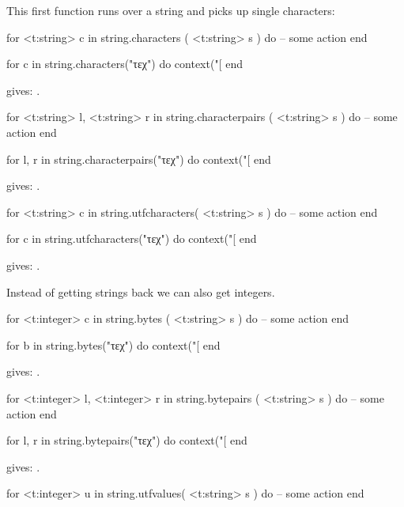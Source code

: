 This first function runs over a string and picks up single characters:

\starttyping[option=LUA]
for <t:string> c in string.characters ( <t:string> s ) do
    -- some action
end
\stoptyping

\startbuffer
\startluacode
for c in string.characters("τεχ") do
    context("[%
end
\stopluacode
\stopbuffer

\typebuffer

gives: \inlinebuffer.

\starttyping[option=LUA]
for <t:string> l, <t:string> r in string.characterpairs ( <t:string> s ) do
    -- some action
end
\stoptyping

\startbuffer
\startluacode
for l, r in string.characterpairs("τεχ") do
    context("[%
end
\stopluacode
\stopbuffer

\typebuffer

gives: \inlinebuffer.

\starttyping[option=LUA]
for <t:string> c in string.utfcharacters( <t:string> s ) do
    -- some action
end
\stoptyping

\startbuffer
\startluacode
for c in string.utfcharacters("τεχ") do
    context("[%
end
\stopluacode
\stopbuffer

\typebuffer

gives: \inlinebuffer.

Instead of getting strings back we can also get integers.

\starttyping[option=LUA]
for <t:integer> c in string.bytes ( <t:string> s ) do
    -- some action
end
\stoptyping

\startbuffer
\startluacode
for b in string.bytes("τεχ") do
    context("[%
end
\stopluacode
\stopbuffer

\typebuffer

gives: \inlinebuffer.

\starttyping[option=LUA]
for <t:integer> l, <t:integer> r in string.bytepairs ( <t:string> s ) do
    -- some action
end
\stoptyping

\startbuffer
\startluacode
for l, r in string.bytepairs("τεχ") do
    context("[%
end
\stopluacode
\stopbuffer

\typebuffer

gives: \inlinebuffer.

\starttyping[option=LUA]
for <t:integer> u in string.utfvalues( <t:string> s ) do
    -- some action
end
\stoptyping

